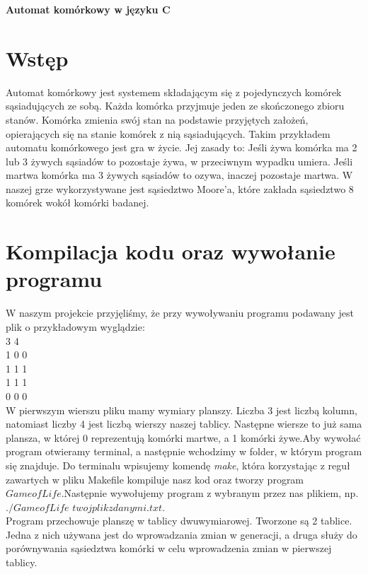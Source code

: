 \documentclass[11pt]{article}
\begin{document}
\begin{huge}
\begin{center}
\textbf{Automat komórkowy w języku C}\\
\end{center}
\end{huge}

\section{Wstęp}
Automat komórkowy jest systemem składającym się z pojedynczych komórek sąsiadujących ze sobą. Każda komórka przyjmuje jeden ze skończonego zbioru stanów. Komórka zmienia swój stan na podstawie przyjętych założeń, opierających się na stanie komórek z nią sąsiadujących. Takim przykładem automatu komórkowego jest gra w życie. Jej zasady to:
Jeśli żywa komórka ma 2 lub 3 żywych sąsiadów to pozostaje żywa, w przeciwnym wypadku umiera. Jeśli martwa komórka ma 3 żywych sąsiadów to ozywa, inaczej pozostaje martwa.
W naszej grze wykorzystywane jest sąsiedztwo Moore’a, które zakłada sąsiedztwo 8 komórek wokół komórki badanej.


\section{Kompilacja kodu oraz wywołanie programu}

W naszym projekcie przyjęliśmy, że przy wywoływaniu programu podawany jest plik o przykładowym wyglądzie: 
\\
3 4 
\\
1 0 0
\\
1 1 1
\\
1 1 1
\\
0 0 0
\\
W pierwszym wierszu pliku mamy wymiary planszy. Liczba 3 jest liczbą kolumn, natomiast liczby 4 jest liczbą wierszy naszej tablicy. Następne wiersze to już sama plansza, w której 0 reprezentują komórki martwe, a 1 komórki żywe.Aby wywołać program otwieramy terminal, a następnie wchodzimy w folder, w którym program się znajduje. Do terminalu wpisujemy komendę \textit{make}, która korzystając z reguł zawartych w pliku Makefile kompiluje nasz kod oraz tworzy program $GameofLife$.Następnie wywołujemy program z wybranym przez nas plikiem, np.\\
$./GameofLife$ $twojplikzdanymi.txt.$
\\
Program przechowuje planszę w tablicy dwuwymiarowej. Tworzone są 2 tablice. Jedna z nich używana jest do wprowadzania zmian w generacji, a druga służy do porównywania sąsiedztwa komórki w celu wprowadzenia zmian w pierwszej tablicy.
\end{document}
